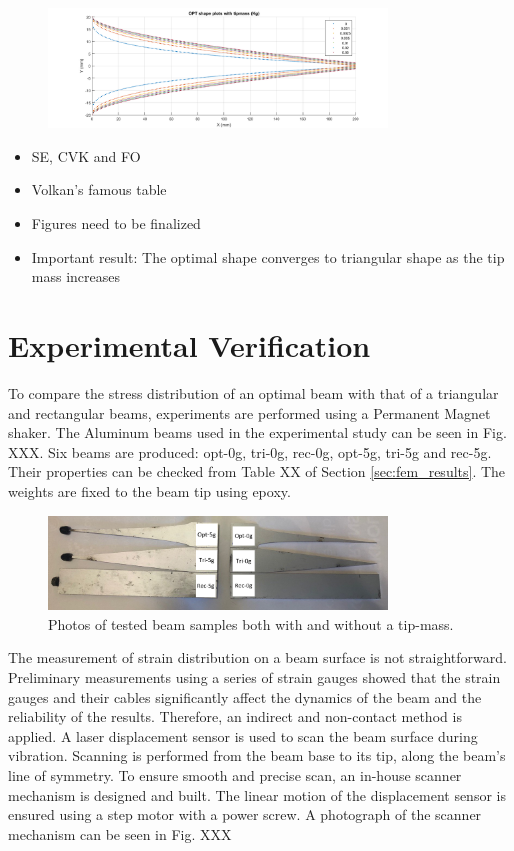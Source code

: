 \documentclass{article}
\begin{document}
\begin{figure}[ht!]
\centering
\includegraphics[width=90mm]{figures/opt_shapes.png}
\caption{ \label{overflow}}
\end{figure}

\begin{itemize}
    \item SE, CVK and FO
    \item Volkan's famous table
    \item Figures need to be finalized
    \item Important result: The optimal shape converges to triangular shape as the tip mass increases

\end{itemize}

\section{Experimental Verification}
\label{sec:exp_results}

To compare the stress distribution of an optimal beam with that of a triangular and rectangular beams, experiments are performed using a Permanent Magnet shaker. The Aluminum beams used in the experimental study can be seen in Fig. XXX. Six beams are produced: opt-0g, tri-0g, rec-0g, opt-5g, tri-5g and rec-5g. Their properties can be checked from Table XX of Section \ref{sec:fem_results}. The weights are fixed to the beam tip using epoxy.

\begin{figure}[ht!]
\centering
\includegraphics[width=90mm]{figures/6beams.PNG}
\caption{Photos of tested beam samples both with and without a tip-mass.}
\label{samples}
\end{figure}

The measurement of strain distribution on a beam surface is not straightforward. Preliminary measurements using a series of strain gauges showed that the strain gauges and their cables significantly affect the dynamics of the beam and the reliability of the results. Therefore, an indirect and non-contact method is applied. A laser displacement sensor is used to scan the beam surface during vibration. Scanning is performed from the beam base to its tip, along the beam's line of symmetry. To ensure smooth and precise scan, an in-house scanner mechanism is designed and built. The linear motion of the displacement sensor is ensured using a step motor with a power screw. A photograph of the scanner mechanism can be seen in Fig. XXX
\end{document}

